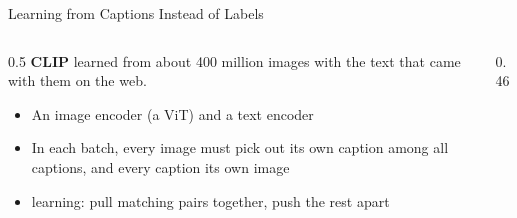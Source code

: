 \newcommand{\coursemodule}{Module 09}





\begin{frame}{Learning from Captions Instead of Labels}
\begin{columns}[T]
\begin{column}{0.5\textwidth}
\textbf{CLIP}  learned from about 400 million images with the text
that came with them on the web.

\vspace{0.15cm}
\begin{itemize}
\item An image encoder (a ViT) and a text encoder
\item In each batch, every image must pick out its own caption among all captions, and every
      caption its own image
\item {} learning: pull matching pairs together, push the rest apart
\end{itemize}
\end{column}
\begin{column}{0.46\textwidth}
\centering
{}\\[2pt]
\end{column}
\end{columns}
\end{frame}

